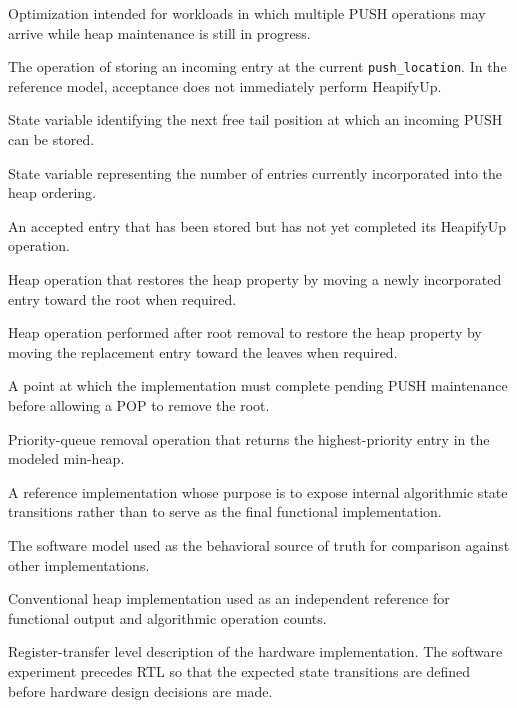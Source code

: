 \documentclass[11pt,a4paper]{article}
\begin{document}
\begin{description}[style=nextline,leftmargin=3.5cm]

\item[Multi-Push]
Optimization intended for workloads in which multiple PUSH operations
may arrive while heap maintenance is still in progress.

\item[PUSH acceptance]
The operation of storing an incoming entry at the current
\texttt{push\_location}. In the reference model, acceptance does not
immediately perform HeapifyUp.

\item[\texttt{push\_location}]
State variable identifying the next free tail position at which an
incoming PUSH can be stored.

\item[\texttt{heap\_size}]
State variable representing the number of entries currently
incorporated into the heap ordering.

\item[Pending PUSH]
An accepted entry that has been stored but has not yet completed its
HeapifyUp operation.

\item[HeapifyUp]
Heap operation that restores the heap property by moving a newly
incorporated entry toward the root when required.

\item[HeapifyDown]
Heap operation performed after root removal to restore the heap
property by moving the replacement entry toward the leaves when
required.

\item[Synchronization point]
A point at which the implementation must complete pending PUSH
maintenance before allowing a POP to remove the root.

\item[POP]
Priority-queue removal operation that returns the highest-priority
entry in the modeled min-heap.

\item[Characterization model]
A reference implementation whose purpose is to expose internal
algorithmic state transitions rather than to serve as the final
functional implementation.

\item[Functional reference]
The software model used as the behavioral source of truth for
comparison against other implementations.

\item[Baseline]
Conventional heap implementation used as an independent reference
for functional output and algorithmic operation counts.

\item[RTL]
Register-transfer level description of the hardware implementation.
The software experiment precedes RTL so that the expected state
transitions are defined before hardware design decisions are made.


\end{description}
\end{document}
